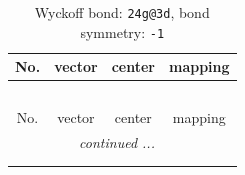 \documentclass[fleqn,8pt]{jsarticle}
\begin{document}
\renewcommand{\arraystretch}{1.2}
\begin{longtable}{cccc}
\caption{Wyckoff bond: {\tt 24g@3d}, bond symmetry: {\tt -1}}
 \\
 \hline \hline
No. & vector & center & mapping \\ \hline \endfirsthead

\multicolumn{3}{l}{\tablename\ \thetable{}} \\
 \hline \hline
No. & vector & center & mapping \\ \hline \endhead

 \hline \hline
\multicolumn{3}{r}{\footnotesize\it continued ...} \\ \endfoot

 \hline \hline
\multicolumn{3}{r}{} \\ \endlastfoot


\end{longtable}
\end{document}
